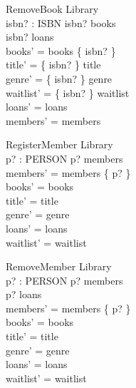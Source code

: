\documentclass{article}
\begin{document}
\begin{schema}{RemoveBook}
  \Delta Library \\
  isbn? : ISBN
\where
  isbn? \in books \\
  isbn? \notin \dom loans \\
  books' = books \setminus \{ isbn? \} \\
  title' = \{ isbn? \} \ndres title \\
  genre' = \{ isbn? \} \ndres genre \\
  waitlist' = \{ isbn? \} \ndres waitlist \\
  loans' = loans \\
  members' = members
\end{schema}

\begin{schema}{RegisterMember}
  \Delta Library \\
  p? : PERSON
\where
  p? \notin members \\
  members' = members \cup \{ p? \} \\
  books' = books \\
  title' = title \\
  genre' = genre \\
  loans' = loans \\
  waitlist' = waitlist
\end{schema}

\begin{schema}{RemoveMember}
  \Delta Library \\
  p? : PERSON
\where
  p? \in members \\
  p? \notin \ran loans \\
  members' = members \setminus \{ p? \} \\
  books' = books \\
  title' = title \\
  genre' = genre \\
  loans' = loans \\
  waitlist' = waitlist
\end{schema}
\end{document}

